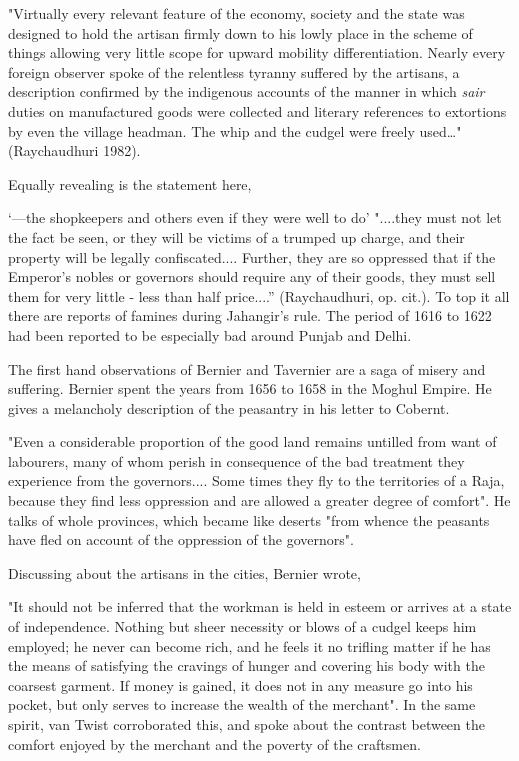"Virtually every relevant feature of the economy, society and the state was designed to hold the artisan firmly down to his lowly place in the scheme of things allowing very little scope for upward mobility differentiation. Nearly every foreign observer spoke of the relentless tyranny suffered by the artisans, a description confirmed by the indigenous accounts of the manner in which {\it sair} duties on manufactured goods were collected and literary references to extortions by even the village headman. The whip and the cudgel were freely used…" (Raychaudhuri 1982).

Equally revealing is the statement here, 

‘---the shopkeepers and others even if they were well to do’ "....they must not let the fact be seen, or they will be victims of a trumped up charge, and their property will be legally confiscated....  Further, they are so oppressed that if the Emperor's nobles or governors should require any of their goods, they must sell them for very little - less than half price....” (Raychaudhuri, op. cit.). To top it all there are reports of famines during Jahangir's rule. The period of 1616 to 1622 had been reported to be especially bad around Punjab and Delhi. 

The first hand observations of Bernier and Tavernier are a saga of misery and suffering. Bernier spent the years from 1656 to 1658 in the Moghul Empire. He gives a melancholy description of the peasantry in his letter to Cobernt. 

 "Even a considerable proportion of the good land remains untilled from want of labourers, many of whom perish in consequence of the bad treatment they experience from the governors.... Some times they fly to the territories of a Raja, because they find less oppression and are allowed a greater degree of comfort".  He talks of whole provinces, which became like deserts "from whence the peasants have fled on account of the oppression of the governors". 

Discussing about the artisans in the cities, Bernier wrote, 

"It should not be inferred that the workman is held in esteem or arrives at a state of independence.  Nothing but sheer necessity or blows of a cudgel keeps him employed; he never can become rich, and he feels it no trifling matter if he has the means of satisfying the cravings of hunger and covering his body with the coarsest garment.  If money is gained, it does not in any measure go into his pocket, but only serves to increase the wealth of the merchant".  In the same spirit, van Twist corroborated this, and spoke about the contrast between the comfort enjoyed by the merchant and the poverty of the craftsmen.

